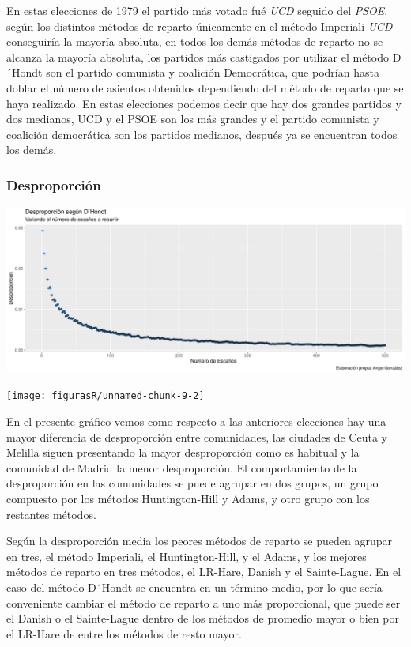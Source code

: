 \documentclass[12pt,a4paper,]{book}
\numberwithin{dummy}{section}
\theoremstyle{ocrenumbox}
\theoremstyle{blacknumex}
\theoremstyle{blacknumbox}
\theoremstyle{ocrenum}
\theoremstyle{ocrenum}
\begin{document}
En estas elecciones de 1979 el partido más votado fué \emph{UCD} seguido
del \emph{PSOE}, según los distintos métodos de reparto únicamente en el
método Imperiali \emph{UCD} conseguiría la mayoría absoluta, en todos
los demás métodos de reparto no se alcanza la mayoría absoluta, los
partidos más castigados por utilizar el método D´Hondt son el partido
comunista y coalición Democrática, que podrían hasta doblar el número de
asientos obtenidos dependiendo del método de reparto que se haya
realizado. En estas elecciones podemos decir que hay dos grandes
partidos y dos medianos, UCD y el PSOE son los más grandes y el partido
comunista y coalición democrática son los partidos medianos, después ya
se encuentran todos los demás.

\hypertarget{desproporciuxf3n-1}{%
\subsubsection{Desproporción}\label{desproporciuxf3n-1}}

\begin{center}\includegraphics[width=1\linewidth]{figurasR/unnamed-chunk-9-1} \end{center}

\begin{center}\texttt{[image: figurasR/unnamed-chunk-9-2]} \end{center}

En el presente gráfico vemos como respecto a las anteriores elecciones
hay una mayor diferencia de desproporción entre comunidades, las
ciudades de Ceuta y Melilla siguen presentando la mayor desproporción
como es habitual y la comunidad de Madrid la menor desproporción. El
comportamiento de la desproporción en las comunidades se puede agrupar
en dos grupos, un grupo compuesto por los métodos Huntington-Hill y
Adams, y otro grupo con los restantes métodos.

Según la desproporción media los peores métodos de reparto se pueden
agrupar en tres, el método Imperiali, el Huntington-Hill, y el Adams, y
los mejores métodos de reparto en tres métodos, el LR-Hare, Danish y el
Sainte-Lague. En el caso del método D´Hondt se encuentra en un término
medio, por lo que sería conveniente cambiar el método de reparto a uno
más proporcional, que puede ser el Danish o el Sainte-Lague dentro de
los métodos de promedio mayor o bien por el LR-Hare de entre los métodos
de resto mayor.
\end{document}
